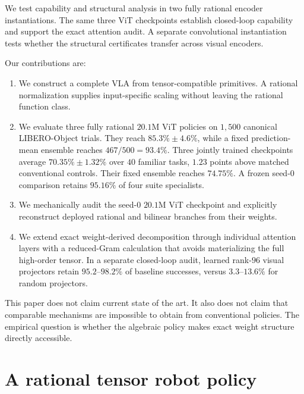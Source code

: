 \documentclass{article}
\begin{document}
We test capability and structural analysis in two fully rational encoder instantiations. The same
three ViT checkpoints establish closed-loop capability and support the exact attention audit. A
separate convolutional instantiation tests whether the structural certificates transfer across
visual encoders.

Our contributions are:

\begin{enumerate}
  \item We construct a complete VLA from tensor-compatible primitives. A rational normalization
        supplies input-specific scaling without leaving the rational function class.
  \item We evaluate three fully rational $20.1$M ViT policies on $1{,}500$ canonical
        LIBERO-Object trials. They reach $85.3\%\pm4.6\%$, while a fixed prediction-mean
        ensemble reaches $467/500=93.4\%$. Three jointly trained checkpoints average
        $70.35\%\pm1.32\%$ over $40$ familiar tasks, $1.23$ points above matched
        conventional controls. Their fixed ensemble reaches
        $74.75\%$. A frozen seed-$0$ comparison retains $95.16\%$ of four suite specialists.
  \item We mechanically audit the seed-$0$ $20.1$M ViT checkpoint and explicitly reconstruct deployed
        rational and bilinear branches from their weights.
  \item We extend exact weight-derived decomposition through individual attention layers with a
        reduced-Gram calculation that avoids materializing the full high-order tensor. In a
        separate closed-loop audit, learned rank-$96$ visual projectors retain $95.2$--$98.2\%$ of
        baseline successes, versus $3.3$--$13.6\%$ for random projectors.
\end{enumerate}

This paper does not claim current state of the art. It also does not claim that comparable
mechanisms are impossible to obtain from conventional policies. The empirical question is
whether the algebraic policy makes exact weight structure directly accessible.

\section{A rational tensor robot policy}
\label{sec:model}
\end{document}
